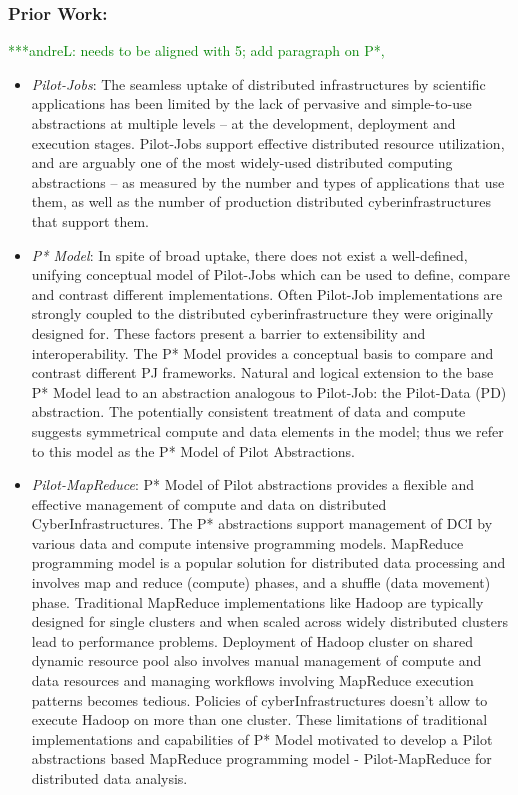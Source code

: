 \documentclass[times]{cpeauth}
\newcommand{\alnote}[1]{ {\textcolor{green} { ***andreL: #1 }}}
\newcommand{\alnote}[1]{}
\begin{document}
\subsubsection*{Prior Work:}
\alnote{needs to be aligned with 5; add paragraph on P*, }
\begin{itemize}

\item {\it Pilot-Jobs}: 
The seamless uptake of distributed infrastructures by scientific applications has been limited by the lack of pervasive and simple-to-use abstractions at multiple levels – at the development, deployment and execution stages. Pilot-Jobs support effective distributed resource utilization, and are arguably one of the most widely-used distributed computing abstractions – as measured by the number and types of applications that use them, as well as the number of production distributed cyberinfrastructures that support them. 

\item {\it P* Model}: 
In spite of broad uptake, there does not exist a well-defined, unifying conceptual model of Pilot-Jobs which can be used to define, compare and contrast different implementations. Often Pilot-Job implementations are strongly coupled to the distributed cyberinfrastructure they were originally designed for. These factors present a barrier to extensibility and interoperability.
The P* Model provides a conceptual basis to compare and contrast different PJ frameworks. Natural and logical extension to the base P* Model lead to an abstraction analogous to Pilot-Job: the Pilot-Data (PD) abstraction. The potentially consistent treatment of data and compute suggests symmetrical compute and data elements in the model; thus we refer to this model as the P* Model of Pilot Abstractions.

\item {\it Pilot-MapReduce}:  P* Model of Pilot abstractions provides a flexible and effective management of compute and data on distributed CyberInfrastructures. The P* abstractions support management of DCI by various data and compute intensive programming models. MapReduce programming model is a popular solution for distributed data processing and involves map and reduce (compute) phases, and a shuffle (data movement) phase. Traditional MapReduce implementations like Hadoop are
typically designed for single clusters and when scaled across widely
distributed clusters lead to performance problems. Deployment of Hadoop
cluster on shared dynamic resource pool also involves manual management of
compute and data resources and managing workflows involving MapReduce
execution patterns becomes tedious. Policies of cyberInfrastructures doesn't
allow to execute Hadoop on more than one cluster. These limitations of
traditional implementations and capabilities of  P* Model motivated to develop a Pilot abstractions based MapReduce programming model - Pilot-MapReduce for distributed data analysis.


\end{itemize}
\end{document}
